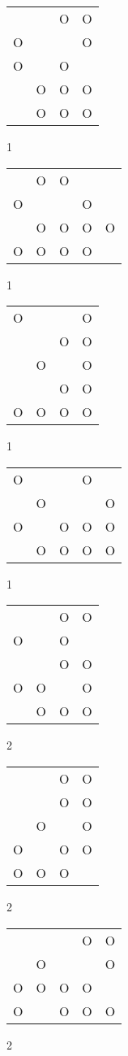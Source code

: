 \begin{tabular}{|m{0.2cm}m{0.2cm}m{0.2cm}m{0.2cm}|}\hline
 & &O&O\\
O& & &O\\
O& &O& \\
 &O&O&O\\
 &O&O&O\\
\hline\end{tabular}1
\begin{tabular}{|m{0.2cm}m{0.2cm}m{0.2cm}m{0.2cm}m{0.2cm}|}\hline
 &O&O& & \\
O& & &O& \\
 &O&O&O&O\\
O&O&O&O& \\
\hline\end{tabular}1
\begin{tabular}{|m{0.2cm}m{0.2cm}m{0.2cm}m{0.2cm}|}\hline
O& & &O\\
 & &O&O\\
 &O& &O\\
 & &O&O\\
O&O&O&O\\
\hline\end{tabular}1
\begin{tabular}{|m{0.2cm}m{0.2cm}m{0.2cm}m{0.2cm}m{0.2cm}|}\hline
O& & &O& \\
 &O& & &O\\
O& &O&O&O\\
 &O&O&O&O\\
\hline\end{tabular}1
\begin{tabular}{|m{0.2cm}m{0.2cm}m{0.2cm}m{0.2cm}|}\hline
 & &O&O\\
O& &O& \\
 & &O&O\\
O&O& &O\\
 &O&O&O\\
\hline\end{tabular}2
\begin{tabular}{|m{0.2cm}m{0.2cm}m{0.2cm}m{0.2cm}|}\hline
 & &O&O\\
 & &O&O\\
 &O& &O\\
O& &O&O\\
O&O&O& \\
\hline\end{tabular}2
\begin{tabular}{|m{0.2cm}m{0.2cm}m{0.2cm}m{0.2cm}m{0.2cm}|}\hline
 & & &O&O\\
 &O& & &O\\
O&O&O&O& \\
O& &O&O&O\\
\hline\end{tabular}2
